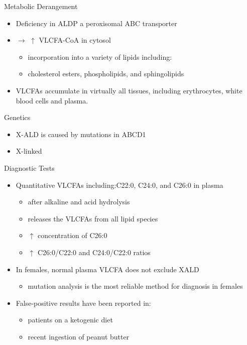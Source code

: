 \documentclass[presentation, smaller]{beamer}
\begin{document}
\begin{frame}[label={sec:org0b20daf}]{Metabolic Derangement}
\begin{itemize}
\item Deficiency in ALDP a peroxisomal ABC transporter
\item \(\to\) \(\uparrow\) VLCFA-CoA in cytosol
\begin{itemize}
\item incorporation into a variety of lipids including:
\item cholesterol esters, phospholipids, and sphingolipids
\end{itemize}
\item VLCFAs accumulate in virtually all tissues, including erythrocytes,
white blood cells and plasma.
\end{itemize}
\end{frame}

\begin{frame}[label={sec:orgfa5d2e0}]{Genetics}
\begin{itemize}
\item X-ALD is caused by mutations in ABCD1
\item X-linked
\end{itemize}
\end{frame}

\begin{frame}[label={sec:org885e872}]{Diagnostic Tests}
\begin{itemize}
\item Quantitative VLCFAs including:C22:0, C24:0, and C26:0 in plasma
\begin{itemize}
\item after alkaline and acid hydrolysis
\item releases the VLCFAs from all lipid species
\item \(\uparrow\) concentration of C26:0
\item \(\uparrow\) C26:0/C22:0 and C24:0/C22:0 ratios
\end{itemize}

\item In females, normal plasma VLCFA does not exclude XALD
\begin{itemize}
\item mutation analysis is the most reliable method for diagnosis in females
\end{itemize}

\item False-positive results have been reported in:
\begin{itemize}
\item patients on a ketogenic diet
\item recent ingestion of peanut butter
\end{itemize}
\end{itemize}
\end{frame}
\end{document}
